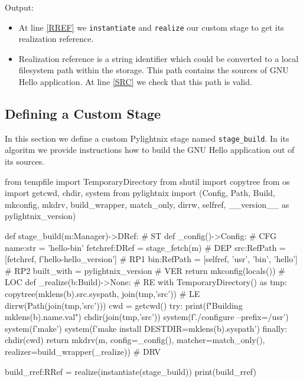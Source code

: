 Output:

\mysmallstdout

\begin{itemize}

  \item At line \ref{RREF} we \texttt{instantiate} and \texttt{realize} our
    custom stage to get its realization reference.

  \item Realization reference is a string identifier which could be converted to
    a local filesystem path within the storage. This path contains the sources
    of GNU Hello application. At line \ref{SRC} we check that this path is
    valid.

\end{itemize}

\pagebreak
\subsection{Defining a Custom Stage}

In this section we define a custom Pylightnix stage named \texttt{stage\_build}.
In its algoritm we provide instructions how to build the GNU Hello application
out of its sources.

\begin{pythontexcode}
from tempfile import TemporaryDirectory
from shutil import copytree
from os import getcwd, chdir, system
from pylightnix import (Config, Path, Build, mkconfig, mkdrv,
  build_wrapper, match_only, dirrw, selfref,
  __version__ as pylightnix_version)

def stage_build(m:Manager)->DRef:                           # ST \label{ST}
  def _config()->Config:                                    # CFG \label{CFG}
    name:str = 'hello-bin'
    fetchref:DRef = stage_fetch(m)                          # DEP \label{DEP}
    src:RefPath = [fetchref, f'hello-{hello_version}']      # RP1 \label{RP1}
    bin:RefPath = [selfref, 'usr', 'bin', 'hello']          # RP2 \label{RP2}
    built_with = pylightnix_version                         # VER \label{VER}
    return mkconfig(locals())                               # LOC \label{LOC}
  def _realize(b:Build)->None:                              # RE \label{RE}
    with TemporaryDirectory() as tmp:
      copytree(mklens(b).src.syspath, join(tmp,'src'))      # LE \label{LE}
      dirrw(Path(join(tmp,'src')))
      cwd = getcwd()
      try:
        print(f"Building {mklens(b).name.val}")
        chdir(join(tmp,'src'))
        system(f'./configure --prefix=/usr')
        system(f'make')
        system(f'make install DESTDIR={mklens(b).syspath}')
      finally:
        chdir(cwd)
  return mkdrv(m, config=_config(),
                  matcher=match_only(),
                  realizer=build_wrapper(_realize))          # DRV \label{DRV}

build_rref:RRef = realize(instantiate(stage_build))
print(build_rref)
\end{pythontexcode}

